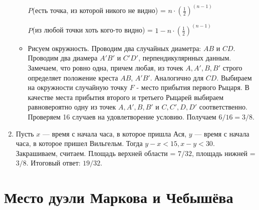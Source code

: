 \documentclass[a4paper,12pt]{article}
\begin{document}
\begin{enumerate}
\begin{itemize}
    $P$(есть точка, из которой никого не видно) = $n \cdot {(\frac{1}{2})}^{(n-1)}$

    $P$(из любой точки хоть кого-то видно) = $1 - n \cdot {(\frac{1}{2})}^{(n-1)} $

    \item Рисуем окружность. Проводим два случайных диаметра: $AB$ и $CD$. Проводим два диамера $A'B'$ и $C'D'$, перпендикулярнных данным. Замечаем, что ровно одна, причем любая, из точек $A, A', B, B'$ строго определяет положение креста $AB$, $A'B'$. Аналогично для $CD$. Выбираем на окружности случайную точку $F$ - место прибытия первого Рыцаря. В качестве места прибытия второго и третьего Рыцарей выбираем равновероятно одну из точек $A, A', B, B'$ и $C, C', D, D'$ соответственно. Проверяем 16 случаев на удовлетворение условию. Получаем $6/16 = 3/8$.
\end{itemize}

\item Пусть $x$ — время с начала часа, в которое пришла Ася, $y$ — время с начала часа, в которое пришел Вильгельм. 
Тогда $y - x < 15, x - y < 30$. Закрашиваем, считаем. 
Площадь верхней области = $7/32$, площадь нижней = $3/8$. Итоговый ответ: $19/32$.
\end{enumerate}

\newpage
\section{Место дуэли Маркова и Чебышёва} %
\end{document}
